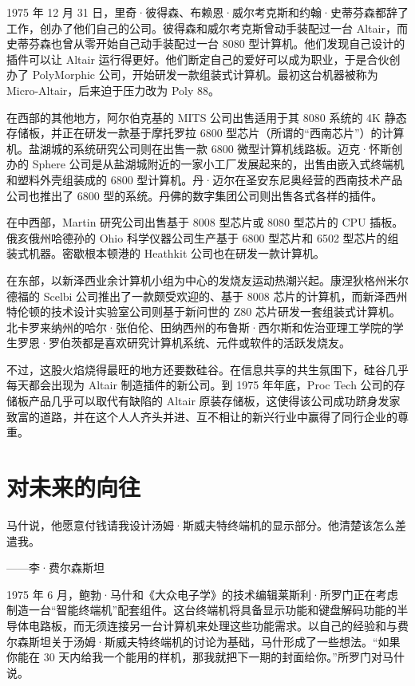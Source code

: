 \documentclass[12pt,UTF8]{ctexbook}
\begin{document}
1975 年 12 月 31 日，里奇·彼得森、布赖恩·威尔考克斯和约翰·史蒂芬森都辞了工作，创办了他们自己的公司。彼得森和威尔考克斯曾动手装配过一台 Altair，而史蒂芬森也曾从零开始自己动手装配过一台 8080 型计算机。他们发现自己设计的插件可以让 Altair 运行得更好。他们断定自己的爱好可以成为职业，于是合伙创办了 PolyMorphic 公司，开始研发一款组装式计算机。最初这台机器被称为 Micro-Altair，后来迫于压力改为 Poly 88。

在西部的其他地方，阿尔伯克基的 MITS 公司出售适用于其 8080 系统的 4K 静态存储板，并正在研发一款基于摩托罗拉 6800 型芯片（所谓的“西南芯片”）的计算机。盐湖城的系统研究公司则在出售一款 6800 微型计算机线路板。迈克·怀斯创办的 Sphere 公司是从盐湖城附近的一家小工厂发展起来的，出售由嵌入式终端机和塑料外壳组装成的 6800 型计算机。丹·迈尔在圣安东尼奥经营的西南技术产品公司也推出了 6800 型的系统。丹佛的数字集团公司则出售各式各样的插件。

在中西部，Martin 研究公司出售基于 8008 型芯片或 8080 型芯片的 CPU 插板。俄亥俄州哈德孙的 Ohio 科学仪器公司生产基于 6800 型芯片和 6502 型芯片的组装式机器。密歇根本顿港的 Heathkit 公司也在研发一款计算机。

在东部，以新泽西业余计算机小组为中心的发烧友运动热潮兴起。康涅狄格州米尔德福的 Scelbi 公司推出了一款颇受欢迎的、基于 8008 芯片的计算机，而新泽西州特伦顿的技术设计实验室公司则基于新问世的 Z80 芯片研发一套组装式计算机。北卡罗来纳州的哈尔·张伯伦、田纳西州的布鲁斯·西尔斯和佐治亚理工学院的学生罗恩·罗伯茨都是喜欢研究计算机系统、元件或软件的活跃发烧友。

不过，这股火焰烧得最旺的地方还要数硅谷。在信息共享的共生氛围下，硅谷几乎每天都会出现为 Altair 制造插件的新公司。到 1975 年年底，Proc Tech 公司的存储板产品几乎可以取代有缺陷的 Altair 原装存储板，这使得该公司成功跻身发家致富的道路，并在这个人人齐头并进、互不相让的新兴行业中赢得了同行企业的尊重。





\section{对未来的向往}


马什说，他愿意付钱请我设计汤姆·斯威夫特终端机的显示部分。他清楚该怎么差遣我。

——李·费尔森斯坦



1975 年 6 月，鲍勃·马什和《大众电子学》的技术编辑莱斯利·所罗门正在考虑制造一台“智能终端机”配套组件。这台终端机将具备显示功能和键盘解码功能的半导体电路板，而无须连接另一台计算机来处理这些功能需求。以自己的经验和与费尔森斯坦关于汤姆·斯威夫特终端机的讨论为基础，马什形成了一些想法。“如果你能在 30 天内给我一个能用的样机，那我就把下一期的封面给你。”所罗门对马什说。
\end{document}
